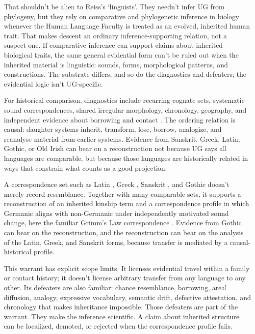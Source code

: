 \documentclass[12pt]{article}
\begin{document}
That shouldn't be alien to Reiss's `linguists'. They needn't infer UG from phylogeny, but they rely on comparative and phylogenetic inference in biology whenever the Human Language Faculty is treated as an evolved, inherited human trait. That makes descent an ordinary inference-supporting relation, not a suspect one. If comparative inference can support claims about inherited biological traits, the same general evidential form can't be ruled out when the inherited material is linguistic: sounds, forms, morphological patterns, and constructions. The substrate differs, and so do the diagnostics and defeaters; the evidential logic isn't UG-specific.

For historical comparison, diagnostics include recurring cognate sets, systematic sound correspondences, shared irregular morphology, chronology, geography, and independent evidence about borrowing and contact \citep{beekes2011comparativeIE}. The ordering relation is causal: daughter systems inherit, transform, lose, borrow, analogize, and reanalyse material from earlier systems. Evidence from Sanskrit, Greek, Latin, Gothic, or Old Irish can bear on a reconstruction not because UG says all languages are comparable, but because those languages are historically related in ways that constrain what counts as a good projection.

A correspondence set such as Latin , Greek , Sanskrit , and Gothic  doesn't merely record resemblance. Together with many comparable sets, it supports a reconstruction of an inherited kinship term and a correspondence profile in which Germanic  aligns with non-Germanic  under independently motivated sound change, here the familiar Grimm's Law correspondence \citep{beekes2011comparativeIE}. Evidence from Gothic can bear on the reconstruction, and the reconstruction can bear on the analysis of the Latin, Greek, and Sanskrit forms, because transfer is mediated by a causal-historical profile.

This warrant has explicit scope limits. It licenses evidential travel within a family or contact history; it doesn't license arbitrary transfer from any language to any other. Its defeaters are also familiar: chance resemblance, borrowing, areal diffusion, analogy, expressive vocabulary, semantic drift, defective attestation, and chronology that makes inheritance impossible. Those defeaters are part of the warrant. They make the inference scientific. A claim about inherited structure can be localized, demoted, or rejected when the correspondence profile fails.
\end{document}

